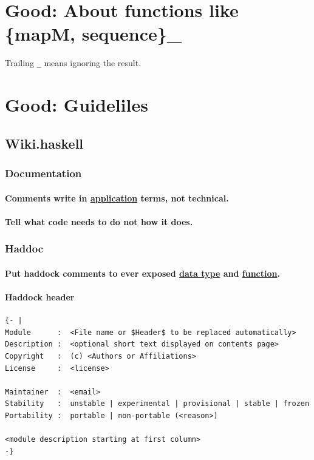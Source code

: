 \documentclass[a4paper,14pt,oneside]{book}
\begin{document}
\chapter{\label{orgb554d16}Good: About functions like \{mapM, sequence\}\_}
\label{sec:org7caf1bf}
Trailing \texttt{\_} means ignoring the result.

\chapter{\label{org87a0115}Good: Guideliles}
\label{sec:org4b2f967}
\section{Wiki.haskell}
\label{sec:orgb8e8d9d}

\subsection{Documentation}
\label{sec:org6bc451e}

\subsubsection{Comments write in \hyperref[orgb96b365]{application} terms, not technical.}
\label{sec:orgd9b6d45}

\subsubsection{Tell what code needs to do not how it does.}
\label{sec:org048041c}

\subsection{Haddoc}
\label{sec:orgb13d8e5}

\subsubsection{Put haddock comments to ever exposed \hyperref[org89def2c]{data type} and \hyperref[orgc39a15c]{function}.}
\label{sec:org078ef6c}

\subsubsection{Haddock header}
\label{sec:org36e8ef2}
\begin{verbatim}
{- |
Module      :  <File name or $Header$ to be replaced automatically>
Description :  <optional short text displayed on contents page>
Copyright   :  (c) <Authors or Affiliations>
License     :  <license>

Maintainer  :  <email>
Stability   :  unstable | experimental | provisional | stable | frozen
Portability :  portable | non-portable (<reason>)

<module description starting at first column>
-}
\end{verbatim}
\end{document}
